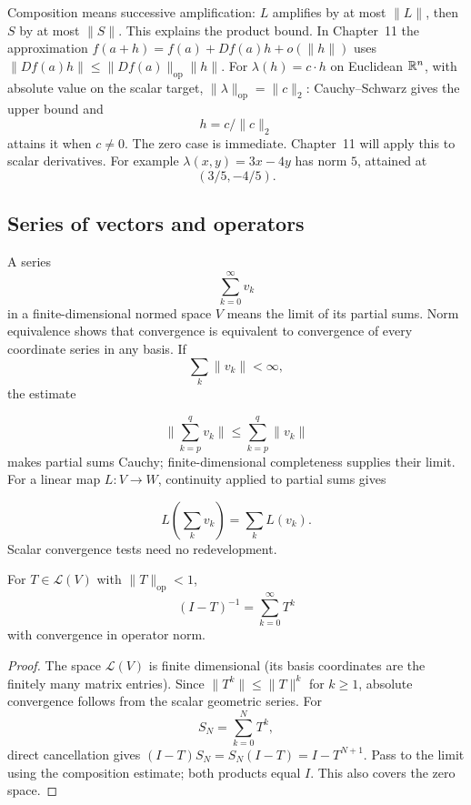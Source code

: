 Composition means successive amplification: $L$ amplifies by at most
$\|L\|$, then $S$ by at most $\|S\|$. This explains the product bound.
In Chapter~11 the approximation $f(a+h)=f(a)+Df(a)h+o(\|h\|)$ uses
$\|Df(a)h\|\leq\|Df(a)\|_{\mathrm{op}}\|h\|$.
For $\lambda(h)=c\cdot h$ on Euclidean $\mathbb{R}^n$, with absolute value on
the scalar target, $\|\lambda\|_{\mathrm{op}}=\|c\|_2$: Cauchy--Schwarz
gives the upper bound and
\[
h=c/\|c\|_2
\]
 attains it when $c\ne0$.
The zero case is immediate. Chapter~11 will apply this to scalar derivatives.
For example $\lambda(x,y)=3x-4y$ has norm $5$, attained at
\[
(3/5,-4/5).
\]


\subsection{Series of vectors and operators}
A series
\[
\sum_{k=0}^\infty v_k
\]
 in a finite-dimensional normed space $V$
means the limit of its partial sums. Norm equivalence shows that convergence
is equivalent to convergence of every coordinate series in any basis.
If
\[
\sum_k\|v_k\|<\infty,
\]
 the estimate

\[
\|\sum_{k=p}^qv_k\|\leq\sum_{k=p}^q\|v_k\|
\]
 makes partial sums Cauchy;
finite-dimensional completeness supplies their limit. For a linear map
$L:V\to W$, continuity applied to partial sums gives

\[
L(\sum_kv_k)=\sum_kL(v_k).
\]
 Scalar convergence tests need no redevelopment.
\begin{proposition}\label{prop:neumann-series}
For $T\in\mathcal L(V)$ with $\|T\|_{\mathrm{op}}<1$,
\[
(I-T)^{-1}=\sum_{k=0}^\infty T^k
\]
with convergence in operator norm.
\end{proposition}
\begin{proof}
The space $\mathcal L(V)$ is finite dimensional (its basis coordinates
are the finitely many matrix entries). Since $\|T^k\|\leq\|T\|^k$
for $k\geq1$, absolute convergence follows from the scalar geometric series.
For
\[
S_N=\sum_{k=0}^NT^k,
\]
 direct cancellation gives
$(I-T)S_N=S_N(I-T)=I-T^{N+1}$. Pass to the limit using the composition
estimate; both products equal $I$. This also covers the zero space.
\end{proof}
